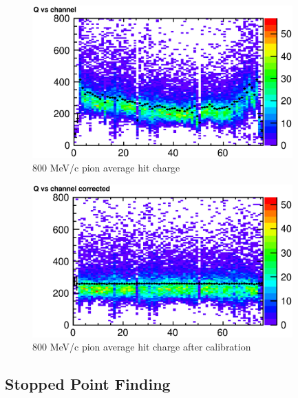 \begin{figure}[htbp]
 \begin{center}
  \includegraphics[width=100mm]{fig/PionQvsCh.eps}
 \end{center}
 \caption{800 MeV/c pion average hit charge}
 \label{fig:PionQvsCh}
\end{figure}

\begin{figure}[htbp]
 \begin{center}
  \includegraphics[width=100mm]{fig/PionQcvsCh.eps}
 \end{center}
 \caption{800 MeV/c pion average hit charge after calibration}
 \label{fig:PionQcvsCh}
\end{figure}

\subsection{Stopped Point Finding}



